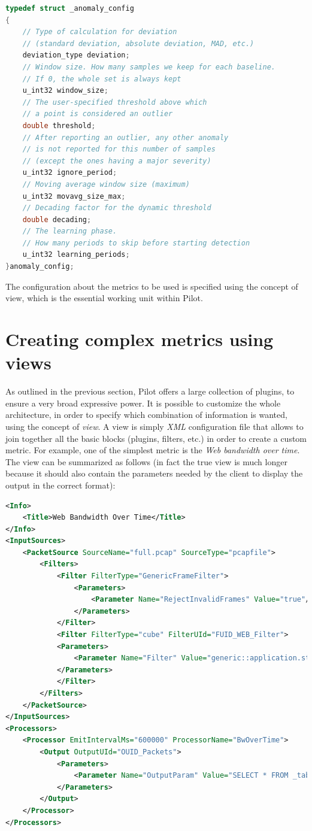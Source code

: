 \documentclass[12pt,a4paper,cucitura]{toptesi}
\begin{document}
\begin{lstlisting}[frame=shadowbox,caption=\emph{C++} configuration structure for the time series anomaly detection algorithm,language=C,tabsize=2,basicstyle=\scriptsize]
typedef struct _anomaly_config
{
	// Type of calculation for deviation 
	// (standard deviation, absolute deviation, MAD, etc.)
	deviation_type deviation;
	// Window size. How many samples we keep for each baseline. 
	// If 0, the whole set is always kept
	u_int32 window_size;
	// The user-specified threshold above which 
	// a point is considered an outlier
	double threshold;
	// After reporting an outlier, any other anomaly 
	// is not reported for this number of samples 
	// (except the ones having a major severity)
	u_int32 ignore_period;
	// Moving average window size (maximum)
	u_int32 movavg_size_max;
	// Decading factor for the dynamic threshold
	double decading;
	// The learning phase.
	// How many periods to skip before starting detection
	u_int32 learning_periods;
}anomaly_config;
\end{lstlisting}

The configuration about the metrics to be used is specified using the concept of view, which is the essential working unit within Pilot.

\section{Creating complex metrics using views}
As outlined in the previous section, Pilot offers a large collection of plugins, to ensure a very broad expressive power.
It is possible to customize the whole architecture, in order to specify which combination of information is wanted, using the concept of \emph{view}.
A view is simply \emph{XML} configuration file that allows to join together all the basic blocks (plugins, filters, etc.) in order to create a custom metric. For example, one of the simplest metric is the \emph{Web bandwidth over time}. The view can be summarized as follows (in fact the true view is much longer because it should also contain the parameters needed by the client to display the output in the correct format):

\begin{lstlisting}[frame=shadowbox,caption=A simple Pilot view,language=XML,tabsize=2,basicstyle=\scriptsize]
<Info> 
	<Title>Web Bandwidth Over Time</Title> 
</Info> 	
<InputSources> 
	<PacketSource SourceName="full.pcap" SourceType="pcapfile"> 
		<Filters> 
			<Filter FilterType="GenericFrameFilter"> 
				<Parameters> 
					<Parameter Name="RejectInvalidFrames" Value="true"/> 
				</Parameters> 
			</Filter> 
			<Filter FilterType="cube" FilterUId="FUID_WEB_Filter"> 
			<Parameters> 
				<Parameter Name="Filter" Value="generic::application.str = Web"/> 
			</Parameters> 
			</Filter> 
		</Filters> 
	</PacketSource> 
</InputSources> 
<Processors> 
	<Processor EmitIntervalMs="600000" ProcessorName="BwOverTime"> 
		<Output OutputUId="OUID_Packets"> 
			<Parameters> 
				<Parameter Name="OutputParam" Value="SELECT * FROM _table_;"/> 
			</Parameters> 
		</Output> 
	</Processor> 
</Processors> 
\end{lstlisting}
\end{document}
